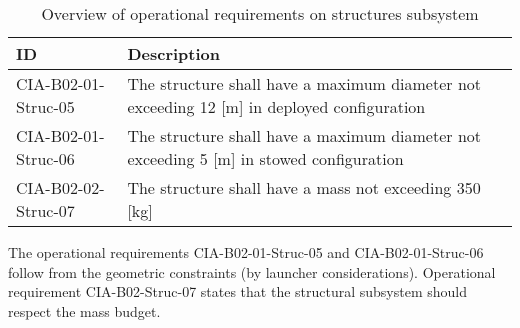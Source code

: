 \begin{table}[H]
	\caption{Overview of operational requirements on structures subsystem}
	\begin{tabular}{|p{}|p{}|}
    \hline
    ID          & Description                                                                                                      \\ \hline \hline
    CIA-B02-01-Struc-05 & The structure shall have a maximum diameter not exceeding 12 [m] in deployed configuration     \\ \hline
    CIA-B02-01-Struc-06 & The structure shall have a maximum diameter not exceeding 5 [m] in stowed configuration                              \\ \hline
    CIA-B02-02-Struc-07 & The structure shall have a mass not exceeding 350 [kg]\\ \hline
    \end{tabular}
    \label{tab:strucoprequirements}
\end{table}
The operational requirements CIA-B02-01-Struc-05 and CIA-B02-01-Struc-06 follow from the geometric constraints (by launcher considerations). Operational requirement CIA-B02-Struc-07 states that the structural subsystem should respect the mass budget.